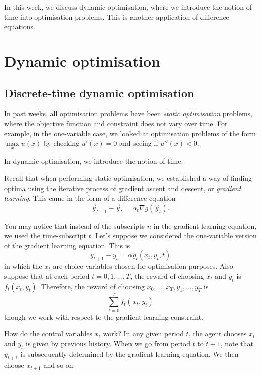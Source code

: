 \documentclass[a4paper, 12pt,oneside,openany]{book}
\begin{document}
In this week, we discuss dynamic optimisation, where we introduce the notion of time into optimisation problems. This is another application of difference equations. 

\section{Dynamic optimisation}

\subsection{Discrete-time dynamic optimisation}

In past weeks, all optimisation problems have been \emph{static optimisation} problems, where the objective function and constraint does not vary over time. For example, in the one-variable case, we looked at optimisation problems of the form $\max\limits_x u(x)$ by checking $u'(x)=0$ and seeing if $u''(x) <0$. 

In dynamic optimisation, we introduce the notion of time.

Recall that when performing static optimisation, we established a way of finding optima using the iterative process of gradient ascent and descent, or \emph{gradient learning}. This came in the form of a difference equation $$\vec{y}_{t+1}-\vec{y}_t = \alpha_t \nabla g(\vec{y}_t).$$ 

You may notice that instead of the subscripts $n$ in the gradient learning equation, we used the time-subscript $t$. Let's suppose we considered the one-variable version of the gradient learning equation. This is $$y_{t+1}-y_t= \alpha g_t(x_t, y_t, t)$$ in which the $x_t$ are choice variables chosen for optimisation purposes. Also suppose that at each period $t=0, 1, \dots, T$, the reward of choosing $x_t$ and $y_t$ is $f_t(x_t, y_t)$. Therefore, the reward of choosing $x_0, \dots, x_T, y_1, \dots, y_T$ is $$\sum\limits_{t=0}^T f_t(x_t, y_t)$$ though we work with respect to the gradient-learning constraint. 


How do the control variables $x_t$ work? In any given period $t$, the agent chooses $x_t$ and $y_t$ is given by previous history. When we go from period $t$ to $t+1$, note that $y_{t+1}$ is subsequently determined by the gradient learning equation. We then choose $x_{t+1}$ and so on.
\end{document}

